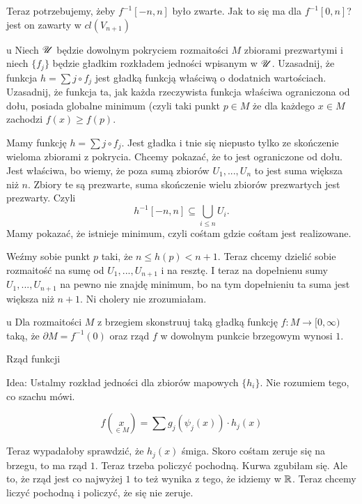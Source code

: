 \documentclass{article}
\begin{document}
Teraz potrzebujemy, żeby $f^{-1}[-n,n]$ było zwarte. Jak to się ma dla $f^{-1}[0,n]$? jest on zawarty w $cl(V_{n+1})$











\begin{problem}{u}
{Niech $\mathcal{U}$ będzie dowolnym pokryciem rozmaitości $M$ zbiorami prezwartymi i niech $\{f_j\}$ będzie gładkim rozkładem jedności wpisanym w $\mathcal{U}$. Uzasadnij, że funkcja $h=\sum j\circ f_j$ jest gładką funkcją właściwą o dodatnich wartościach. Uzasadnij, że funkcja ta, jak każda rzeczywista funkcja właściwa ograniczona od dołu, posiada globalne minimum (czyli taki punkt $p\in M$ że dla każdego $x\in M$ zachodzi $f(x)\geq f(p)$.}
\end{problem}

Mamy funkcję $h=\sum j\circ f_j$. Jest gładka i tnie się niepusto tylko ze skończenie wieloma zbiorami z pokrycia. Chcemy pokazać, że to jest ograniczone od dołu. Jest właściwa, bo wiemy, że poza sumą zbiorów $U_1,...,U_n$ to jest suma większa niż $n$. Zbiory te są prezwarte, suma skończenie wielu zbiorów prezwartych jest prezwarty. Czyli 
$$h^{-1}[-n,n]\subseteq\bigcup\limits_{i\leq n}U_i.$$
Mamy pokazać, że istnieje minimum, czyli cośtam gdzie cośtam jest realizowane.

Weźmy sobie punkt $p$ taki, że $n\leq h(p)< n+1$. Teraz chcemy dzielić sobie rozmaitość na sumę od $U_1,...,U_{n+1}$ i na resztę. I teraz na dopełnienu sumy $U_1,...,U_{n+1}$ na pewno nie znajdę minimum, bo na tym dopełnieniu ta suma jest większa niż $n+1$. Ni cholery nie zrozumiałam.

\begin{problem}{u}
{Dla rozmaitości $M$ z brzegiem skonstruuj taką gładką funkcję $f:M\to[0,\infty)$ taką, że $\partial M=f^{-1}(0)$ oraz rząd $f$ w dowolnym punkcie brzegowym wynosi $1$.}
\end{problem}

Rząd funkcji 

Idea:
Ustalmy rozkład jedności dla zbiorów mapowych $\{h_i\}$. Nie rozumiem tego, co szachu mówi.

$$f(\underset{\in M}{x})=\sum g_j(\psi_j(x))\cdot h_j(x)$$

Teraz wypadałoby sprawdzić, że $h_j(x)$ śmiga. Skoro cośtam zeruje się na brzegu, to ma rząd $1$. Teraz trzeba policzyć pochodną. Kurwa zgubiłam się. Ale to, że rząd jest co najwyżej $1$ to też wynika z tego, że idziemy w $\mathbb{R}$. Teraz chcemy liczyć pochodną i policzyć, że się nie zeruje.
\end{document}
